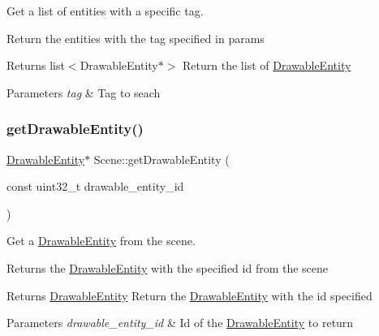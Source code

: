 Get a list of entities with a specific tag. 

Return the entities with the tag specified in params

\begin{DoxyReturn}{Returns}
list$<$\+Drawable\+Entity$\ast$$>$ Return the list of \hyperlink{class_drawable_entity}{Drawable\+Entity} 
\end{DoxyReturn}

\begin{DoxyParams}{Parameters}
{\em tag} & Tag to seach \\
\hline
\end{DoxyParams}
\mbox{\label{class_scene_ab56474670cf57cc422adcbd3c4368137}} 
\subsubsection{\texorpdfstring{get\+Drawable\+Entity()}{getDrawableEntity()}}
{\footnotesize\ttfamily \hyperlink{class_drawable_entity}{Drawable\+Entity}$\ast$ Scene\+::get\+Drawable\+Entity (\begin{DoxyParamCaption}\item[{const uint32\+\_\+t}]{drawable\+\_\+entity\+\_\+id }\end{DoxyParamCaption})}



Get a \hyperlink{class_drawable_entity}{Drawable\+Entity} from the scene. 

Returns the \hyperlink{class_drawable_entity}{Drawable\+Entity} with the specified id from the scene

\begin{DoxyReturn}{Returns}
\hyperlink{class_drawable_entity}{Drawable\+Entity} Return the \hyperlink{class_drawable_entity}{Drawable\+Entity} with the id specified 
\end{DoxyReturn}

\begin{DoxyParams}{Parameters}
{\em drawable\+\_\+entity\+\_\+id} & Id of the \hyperlink{class_drawable_entity}{Drawable\+Entity} to return \\
\hline
\end{DoxyParams}
\mbox{\label{class_scene_a1c7233bcc955b7b71156b31205ec2360}} 
